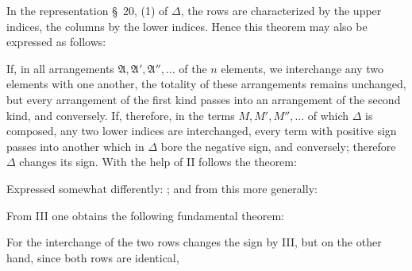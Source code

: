
In the representation \S~20, (1) of \(\Delta\), the rows are characterized by the upper indices, the columns by the lower indices. Hence this theorem may also be expressed as follows:


If, in all arrangements \(\mathfrak A,\mathfrak A',\mathfrak A'',\ldots\) of the \(n\) elements, we interchange any two elements with one another, the totality of these arrangements remains unchanged, but every arrangement of the first kind passes into an arrangement of the second kind, and conversely. If, therefore, in the terms \(M,M',M'',\ldots\) of which \(\Delta\) is composed, any two lower indices are interchanged, every term with positive sign passes into another which in \(\Delta\) bore the negative sign, and conversely; therefore \(\Delta\) changes its sign. With the help of II follows the theorem:


Expressed somewhat differently: ; and from this more generally:


From III one obtains the following fundamental theorem:


For the interchange of the two rows changes the sign by III, but on the other hand, since both rows are identical,
